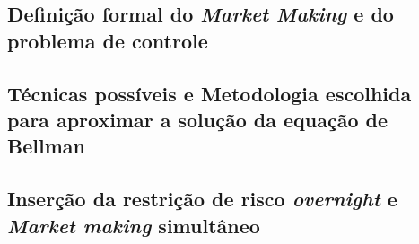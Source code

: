 \subsection{Definição formal do \textit{Market Making} e do problema de controle}
\label{section:problem_description/definition}


\subsection{Técnicas possíveis e Metodologia escolhida para aproximar a solução da equação de Bellman}
\label{section:problem_description/techniques}


\subsection{Inserção da restrição de risco \textit{overnight} e \textit{Market making} simultâneo}
\label{section:problem_description/multivariate_mm}

